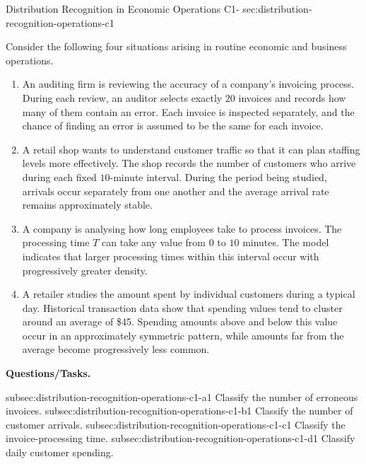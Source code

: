 	\sectionScored
	{Distribution Recognition in Economic Operations}
	{C1-}
	{sec:distribution-recognition-operations-c1}
	{
		Consider the following four situations arising in routine economic and business operations.
		
		\begin{enumerate}
			\item An auditing firm is reviewing the accuracy of a company's invoicing process. During each review, an auditor selects exactly $20$ invoices and records how many of them contain an error. Each invoice is inspected separately, and the chance of finding an error is assumed to be the same for each invoice.
			
			\item A retail shop wants to understand customer traffic so that it can plan staffing levels more effectively. The shop records the number of customers who arrive during each fixed $10$-minute interval. During the period being studied, arrivals occur separately from one another and the average arrival rate remains approximately stable.
			
			\item A company is analysing how long employees take to process invoices. The processing time $T$ can take any value from $0$ to $10$ minutes. The model indicates that larger processing times within this interval occur with progressively greater density.
			
			\item A retailer studies the amount spent by individual customers during a typical day. Historical transaction data show that spending values tend to cluster around an average of \$45. Spending amounts above and below this value occur in an approximately symmetric pattern, while amounts far from the average become progressively less common.
		\end{enumerate}
		
		\textbf{Questions/Tasks.}
		\begin{enumerate}
			\CriterionTask
			{subsec:distribution-recognition-operations-c1-a}{1}
			{Classify the number of erroneous invoices. }
			\CriterionTask
			{subsec:distribution-recognition-operations-c1-b}{1}
			{Classify the number of customer arrivals. }
			\CriterionTask
			{subsec:distribution-recognition-operations-c1-c}{1}
			{Classify the invoice-processing time. }
			\CriterionTask
			{subsec:distribution-recognition-operations-c1-d}{1}
			{Classify daily customer spending. }
		\end{enumerate}
		
}
